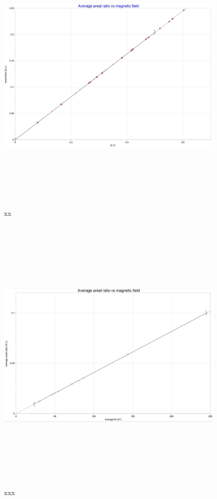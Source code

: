 \documentclass[fleqn]{article}
\begin{document}
  \begin{figure}[h!]
    \includegraphics[height=14cm, width=16cm]{Figure2.JPG}
    \caption{xx}
  \end{figure}

  \pagebreak

  \begin{figure}[h!]
    \includegraphics[height=14cm, width=16cm]{Figure3.JPG}
    \caption{xxx}
  \end{figure}
\end{document}
